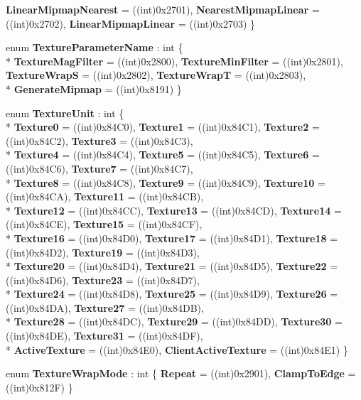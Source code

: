 \begin{DoxyCompactItemize}
{\bfseries Linear\-Mipmap\-Nearest} = ((int)0x2701), 
{\bfseries Nearest\-Mipmap\-Linear} = ((int)0x2702), 
{\bfseries Linear\-Mipmap\-Linear} = ((int)0x2703)
 \}
\item 
enum {\bfseries Texture\-Parameter\-Name} \-: int \{ \\*
{\bfseries Texture\-Mag\-Filter} = ((int)0x2800), 
{\bfseries Texture\-Min\-Filter} = ((int)0x2801), 
{\bfseries Texture\-Wrap\-S} = ((int)0x2802), 
{\bfseries Texture\-Wrap\-T} = ((int)0x2803), 
\\*
{\bfseries Generate\-Mipmap} = ((int)0x8191)
 \}
\item 
enum {\bfseries Texture\-Unit} \-: int \{ \\*
{\bfseries Texture0} = ((int)0x84\-C0), 
{\bfseries Texture1} = ((int)0x84\-C1), 
{\bfseries Texture2} = ((int)0x84\-C2), 
{\bfseries Texture3} = ((int)0x84\-C3), 
\\*
{\bfseries Texture4} = ((int)0x84\-C4), 
{\bfseries Texture5} = ((int)0x84\-C5), 
{\bfseries Texture6} = ((int)0x84\-C6), 
{\bfseries Texture7} = ((int)0x84\-C7), 
\\*
{\bfseries Texture8} = ((int)0x84\-C8), 
{\bfseries Texture9} = ((int)0x84\-C9), 
{\bfseries Texture10} = ((int)0x84\-C\-A), 
{\bfseries Texture11} = ((int)0x84\-C\-B), 
\\*
{\bfseries Texture12} = ((int)0x84\-C\-C), 
{\bfseries Texture13} = ((int)0x84\-C\-D), 
{\bfseries Texture14} = ((int)0x84\-C\-E), 
{\bfseries Texture15} = ((int)0x84\-C\-F), 
\\*
{\bfseries Texture16} = ((int)0x84\-D0), 
{\bfseries Texture17} = ((int)0x84\-D1), 
{\bfseries Texture18} = ((int)0x84\-D2), 
{\bfseries Texture19} = ((int)0x84\-D3), 
\\*
{\bfseries Texture20} = ((int)0x84\-D4), 
{\bfseries Texture21} = ((int)0x84\-D5), 
{\bfseries Texture22} = ((int)0x84\-D6), 
{\bfseries Texture23} = ((int)0x84\-D7), 
\\*
{\bfseries Texture24} = ((int)0x84\-D8), 
{\bfseries Texture25} = ((int)0x84\-D9), 
{\bfseries Texture26} = ((int)0x84\-D\-A), 
{\bfseries Texture27} = ((int)0x84\-D\-B), 
\\*
{\bfseries Texture28} = ((int)0x84\-D\-C), 
{\bfseries Texture29} = ((int)0x84\-D\-D), 
{\bfseries Texture30} = ((int)0x84\-D\-E), 
{\bfseries Texture31} = ((int)0x84\-D\-F), 
\\*
{\bfseries Active\-Texture} = ((int)0x84\-E0), 
{\bfseries Client\-Active\-Texture} = ((int)0x84\-E1)
 \}
\item 
enum {\bfseries Texture\-Wrap\-Mode} \-: int \{ {\bfseries Repeat} = ((int)0x2901), 
{\bfseries Clamp\-To\-Edge} = ((int)0x812\-F)
 \}
\end{DoxyCompactItemize}
